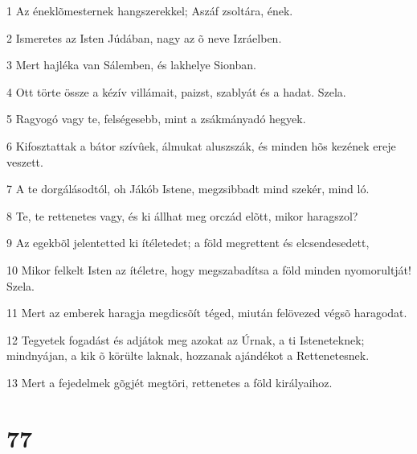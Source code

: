 \par 1 Az éneklõmesternek hangszerekkel; Aszáf zsoltára, ének.
\par 2 Ismeretes az Isten Júdában, nagy az õ neve Izráelben.
\par 3 Mert hajléka van Sálemben, és lakhelye Sionban.
\par 4 Ott törte össze a kézív villámait, paizst, szablyát és a hadat. Szela.
\par 5 Ragyogó vagy te, felségesebb, mint a zsákmányadó hegyek.
\par 6 Kifosztattak a bátor szívûek, álmukat aluszszák, és minden hõs kezének ereje veszett.
\par 7 A te dorgálásodtól, oh Jákób Istene, megzsibbadt mind szekér, mind ló.
\par 8 Te, te rettenetes vagy, és ki állhat meg orczád elõtt, mikor haragszol?
\par 9 Az egekbõl jelentetted ki ítéletedet; a föld megrettent és elcsendesedett,
\par 10 Mikor felkelt Isten az ítéletre, hogy megszabadítsa a föld minden nyomorultját! Szela.
\par 11 Mert az emberek haragja megdicsõít téged, miután felövezed végsõ haragodat.
\par 12 Tegyetek fogadást és adjátok meg azokat az Úrnak, a ti Isteneteknek; mindnyájan, a kik õ körülte laknak, hozzanak ajándékot a Rettenetesnek.
\par 13 Mert a fejedelmek gõgjét megtöri, rettenetes a föld királyaihoz.

\chapter{77}

